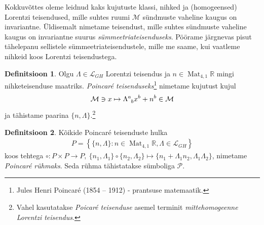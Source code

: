\documentclass[12pt]{article}
\theoremstyle{plain}
\theoremstyle{definition}
\newtheorem{definitsioon}{Definitsioon}[section]
\numberwithin{equation}{section}
\def\R{{\mathbb R}}
\def\L{{\mathcal L}}
\def\M{{\mathcal M}}
\def\P{{\mathcal P}}
\DeclareMathOperator{\Mat}{Mat}
\begin{document}
Kokkuvõttes oleme leidnud kaks kujutuste klassi, nihked ja 
(homogeensed) Lorentzi teisendused, mille suhtes ruumi $\M$ 
sündmuste vaheline kaugus on invariantne. Üldisemalt nimetame 
teisendust, mille suhtes sündmuste vaheline kaugus on invariantne 
suurus \emph{sümmeetriateisenduseks}. Pöörame järgnevas pisut 
tähelepanu sellistele sümmeetria\-teisendustele, mille me saame, kui 
vaatleme nihkeid koos Lorentzi teisendustega.

\begin{definitsioon}
Olgu $\Lambda \in \L_{GH}$ Lorentzi teisendus ja 
$n \in \Mat_{4, 1}\R$ mingi nihketeisenduse maatriks. 
\emph{Poincar\'e teisenduseks}\footnote{Jules Henri Poincaré 
(1854 – 1912) - prantsuse matemaatik.} nimetame kujutust kujul
\begin{align*}
\M \ni x \mapsto \Lambda\indices{^a_b} x^b + n^b \in \M
\end{align*}
ja tähistame paarina $\{n, \Lambda\}$.\footnote{Vahel 
kasutatakse \emph{Poicar\'e teisenduse} asemel terminit 
\emph{mittehomogeenne Lorentzi teisendus}.}
\end{definitsioon}

\begin{definitsioon} \textnormal{\cite{Barut}}
Kõikide Poincar\'e teisenduste hulka
\begin{align*}
P = \left\lbrace \{n, \Lambda\} : n \in \Mat_{4, 1}\R, \Lambda \in 
\L_{GH} \right\rbrace
\end{align*}
koos tehtega $\circ : P \times P \rightarrow P,\ \{n_1, \Lambda_1\} 
\circ \{n_2, \Lambda_2\} \mapsto \{n_1 + \Lambda_1 n_2, \Lambda_1 
\Lambda_2\}$, nimetame \emph{Poincar\'e rühmaks}. Seda rühma 
tähistatakse sümboliga $\P$.
\end{definitsioon}
\end{document}

